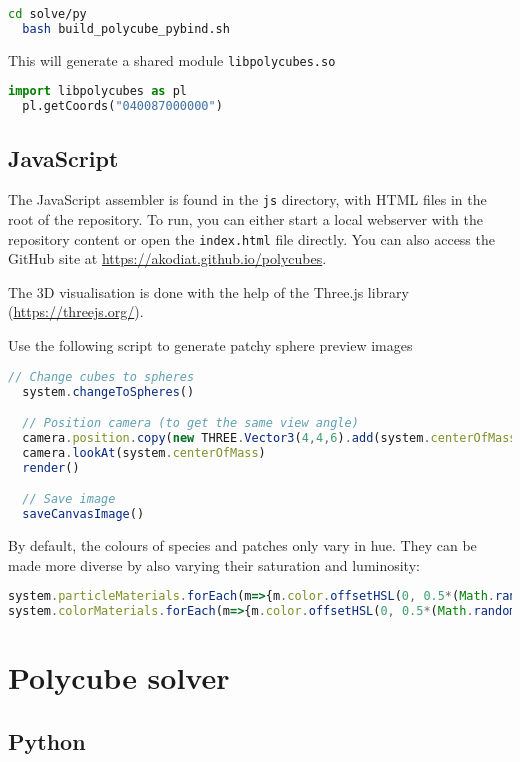 \begin{lstlisting}[language=bash]
  cd solve/py
  bash build_polycube_pybind.sh
\end{lstlisting}

This will generate a shared module \texttt{libpolycubes.so}

\begin{lstlisting}[language=python]
  import libpolycubes as pl
  pl.getCoords("040087000000")
\end{lstlisting}


\subsection{JavaScript}
The JavaScript assembler is found in the \texttt{js} directory, with HTML files in the root of the repository. To run, you can either start a local webserver with the repository content or open the \texttt{index.html} file directly. You can also access the GitHub site at \url{https://akodiat.github.io/polycubes}.

The 3D visualisation is done with the help of the Three.js library (\url{https://threejs.org/}).

Use the following script to generate patchy sphere preview images
\begin{lstlisting}[language=JavaScript]
  // Change cubes to spheres
  system.changeToSpheres()

  // Position camera (to get the same view angle)
  camera.position.copy(new THREE.Vector3(4,4,6).add(system.centerOfMass))
  camera.lookAt(system.centerOfMass)
  render()

  // Save image
  saveCanvasImage()
\end{lstlisting}

By default, the colours of species and patches only vary in hue. They can be made more diverse by also varying their saturation and luminosity:
\begin{lstlisting}[language=JavaScript]
system.particleMaterials.forEach(m=>{m.color.offsetHSL(0, 0.5*(Math.random()-0.5), 0.5*(Math.random()-0.5))})
system.colorMaterials.forEach(m=>{m.color.offsetHSL(0, 0.5*(Math.random()-0.5), 0.5*(Math.random()-0.5))})
\end{lstlisting}


\section{Polycube solver}

\subsection{Python}

